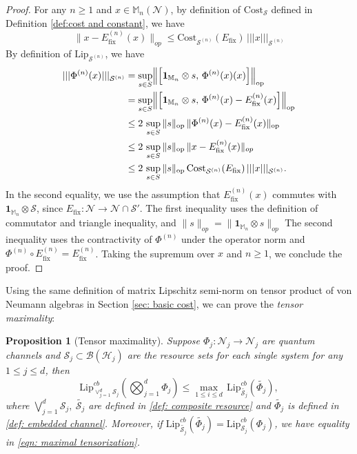 \documentclass[11pt,reqno]{amsart}
\numberwithin{equation}{section}
\newtheorem{prop}[lemma]{Proposition}
\newcommand{\mb}{\mathbb}
\newcommand{\wt}{\widetilde}
\newcommand{\mc}{\mathcal}
\newcommand{\Lip}{\mathrm{Lip}}
\newcommand{\Cost}{\mathrm{Cost}}
\newcommand{\fix}{\mathrm{fix}}
\begin{document}
\begin{proof}
    For any $n \ge 1$ and $x\in \mb M_n(\mc N)$, by definition of $\Cost_{\mc S}$ defined in Definition \ref{def:cost and constant}, we have
\begin{equation}
   \|x - E_\fix^{(n)}(x)\|_{op} \le \Cost_{\mc S^{(n)}}(E_\fix)\,|||x|||_{\mc S^{(n)}}
\end{equation}
By definition of $\Lip_{\mc S^{(n)}}$, we have
\begin{align*}
    |||\Phi^{(n)}(x)|||_{\mc S^{(n)}}
    &= \sup_{s\in S} \Bigl\|\Bigl[\mathbf{1}_{\mathbb{M}_n}\otimes s,\,\Phi^{(n)}(x)(x)\Bigr]\Bigr\|_{\rm op} \\
    &= \sup_{s\in S} \Bigl\|\Bigl[\mathbf{1}_{\mathbb{M}_n}\otimes s,\,\Phi^{(n)}(x) - E_\fix^{(n)}(x)\Bigr]\Bigr\|_{\rm op} \\
    &\le 2\, \sup_{s \in S}\|s\|_{\rm op}\, \|\Phi^{(n)}(x) - E_\fix^{(n)}(x)\|_{\rm op} \\
    &\le 2\, \sup_{s \in S}\|s\|_{\rm op}\, \|x - E_\fix^{(n)}(x)\|_{op} \\
    & \le 2\, \sup_{s \in S}\|s\|_{\rm op}\, \Cost_{\mc S^{(n)}}(E_\fix)\,|||x|||_{\mc S^{(n)}}.
\end{align*}
In the second equality, we use the assumption that $E_\fix^{(n)}(x)$ commutes with $\mathbf{1}_{\mathbb{M}_n} \otimes \mc S$, since $E_\fix: \mc N\to \mc N\cap \mc S'$. The first inequality uses the definition of commutator and triangle inequality, and $\|s\|_{op} = \|\mathbf{1}_{\mathbb{M}_n}\otimes s\|_{op}$ The second inequality uses the contractivity of $\Phi^{(n)}$ under the operator norm and $\Phi^{(n)} \circ E_{\fix}^{(n)} = E_{\fix}^{(n)}$. Taking the supremum over $x$ and $n \ge 1$, we conclude the proof. 
\end{proof}
Using the same definition of matrix Lipschitz semi-norm on tensor product of von Neumann algebras in Section \ref{sec: basic cost}, we can prove the \textit{tensor maximality}:
\begin{prop}[Tensor maximality]\label{main:maximality}
Suppose $\Phi_j: \mc N_j \to \mc N_j$ are quantum channels and $\mc S_j \subset \mc B(\mc H_j)$ are the resource sets for each single system for any $1\le j \le d$, then 
 \begin{equation}\label{eqn: maximal tensorization}
        \Lip^{cb}_{\vee_{j=1}^d \mc S_j}\left( \bigotimes_{j=1}^d \Phi_j \right) \le \max_{1 \le i \le d}\, \Lip_{\wt {\mc S_j}}^{cb}(\wt {\Phi_j}),
    \end{equation}
where $\bigvee_{j=1}^d \mc S_j,\ \wt {\mc S_j}$ are defined in \eqref{def: composite resource} and $\wt{\Phi_j}$ is defined in \eqref{def: embedded channel}. Moreover, if $\Lip_{\wt {\mc S_j}}^{cb}(\wt {\Phi_j}) = \Lip_{\mc S_j}^{cb}(\Phi_j)$, we have equality in \eqref{eqn: maximal tensorization}.
\end{prop}
\end{document}

